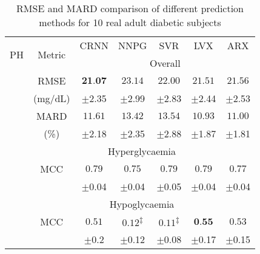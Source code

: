 \documentclass[a4paper, 10 pt, twocolumn]{IEEEtran}
\begin{document}
\begin{table}[!ht]
	\centering
	\small{
	\caption{RMSE and MARD comparison of different prediction methods for 10 real adult diabetic subjects}\label{table:clinical10RMSE}
	\centering
	\begin{tabular}{|c|c|c|c|c|c|c|}
		\hline
		 \multirow{2}{*}{PH}  & \multirow{2}{*}{Metric} & CRNN & NNPG & SVR & LVX & ARX \\
		\cline{3-7}
		 \multirow{13}{*}{30} &&\multicolumn{5}{c|}{Overall}\\
		\hline
		        & RMSE  & $\textbf{21.07}$ & $23.14$ &$22.00$ & $21.51$ & $21.56$\\
		                       &(mg/dL)&$\pm$2.35&$\pm$2.99&$\pm$2.83&$\pm$2.44&$\pm$2.53\\
		\cline{2-7}
		                       & MARD  & $11.61$ & $13.42$ &$13.54$  & \textbf{$10.93$} & $11.00$  \\
		                       & (\%)  &$\pm$2.18&$\pm$2.35&$\pm$2.88&$\pm$1.87&$\pm$1.81\\
		\cline{2-7}
		                       &       \multicolumn{6}{c|}{Hyperglycaemia}\\
		\cline{2-7}
		                       & MCC & \textbf{$0.79$} & $0.75$ &$0.79$ & $0.79$ & $0.77$  \\
		                       &     & $\pm$0.04&$\pm$0.04&$\pm$0.05&$\pm$0.04&$\pm$0.04\\
		\cline{2-7}
		                       &     \multicolumn{6}{c|}{Hypoglycaemia}\\
		\cline{2-7}
		                       & MCC & $0.51$ & $0.12$\textsuperscript{$\ddagger$} &$0.11$\textsuperscript{$\ddagger$} & $\textbf{0.55}$ & $0.53$  \\
		                       &     & $\pm$0.2&$\pm$0.12&$\pm$0.08&$\pm$0.17&$\pm$0.15\\
		

\end{tabular}}
\end{table}
\end{document}
